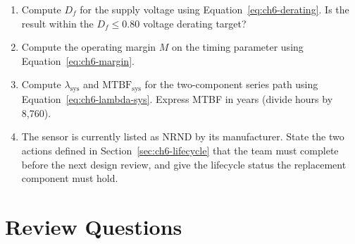 \begin{enumerate}
  \item[(a)] Compute $D_f$ for the supply voltage using Equation~\ref{eq:ch6-derating}.
             Is the result within the $D_f \leq 0.80$ voltage derating target?

  \item[(b)] Compute the operating margin $M$ on the timing parameter using
             Equation~\ref{eq:ch6-margin}.

  \item[(c)] Compute $\lambda_{\text{sys}}$ and $\mathrm{MTBF}_{\text{sys}}$ for the two-component
             series path using Equation~\ref{eq:ch6-lambda-sys}.
             Express MTBF in years (divide hours by 8{,}760).

  \item[(d)] The sensor is currently listed as NRND by its manufacturer.
             State the two actions defined in Section~\ref{sec:ch6-lifecycle} that the team must complete before the next design review, and give the lifecycle status the replacement component must hold.
\end{enumerate}

\section{Review Questions}
\label{sec:ch6-review}

